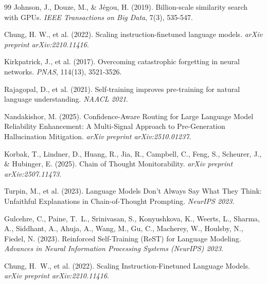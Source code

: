 \documentclass[12pt,a4paper]{article}
\theoremstyle{definition}
\begin{document}
\begin{thebibliography}{99}
Johnson, J., Douze, M., \& J\'{e}gou, H. (2019).
Billion-scale similarity search with GPUs.
\textit{IEEE Transactions on Big Data}, 7(3), 535-547.

Chung, H. W., et al. (2022).
Scaling instruction-finetuned language models.
\textit{arXiv preprint arXiv:2210.11416}.

Kirkpatrick, J., et al. (2017).
Overcoming catastrophic forgetting in neural networks.
\textit{PNAS}, 114(13), 3521-3526.

Rajagopal, D., et al. (2021).
Self-training improves pre-training for natural language understanding.
\textit{NAACL 2021}.

Nandakishor, M. (2025).
Confidence-Aware Routing for Large Language Model Reliability Enhancement: A Multi-Signal Approach to Pre-Generation Hallucination Mitigation.
\textit{arXiv preprint arXiv:2510.01237}.

Korbak, T., Lindner, D., Huang, R., Jia, R., Campbell, C., Feng, S., Scheurer, J., \& Hubinger, E. (2025).
Chain of Thought Monitorability.
\textit{arXiv preprint arXiv:2507.11473}.

Turpin, M., et al. (2023).
Language Models Don't Always Say What They Think: Unfaithful Explanations in Chain-of-Thought Prompting.
\textit{NeurIPS 2023}.

Gulcehre, C., Paine, T.\ L., Srinivasan, S., Konyushkova, K., Weerts, L., Sharma, A., Siddhant, A., Ahuja, A., Wang, M., Gu, C., Macherey, W., Houlsby, N., Fiedel, N. (2023).
Reinforced Self-Training (ReST) for Language Modeling.
\textit{Advances in Neural Information Processing Systems (NeurIPS) 2023}.

Chung, H.\ W., et al. (2022).
Scaling Instruction-Finetuned Language Models.
\textit{arXiv preprint arXiv:2210.11416}.

\end{thebibliography}
\end{document}
